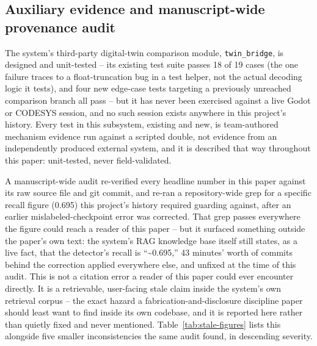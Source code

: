 \subsection{Auxiliary evidence and manuscript-wide provenance audit}
\label{sec:results-audit}

The system's third-party digital-twin comparison module, \texttt{twin\_bridge}, is designed and
unit-tested -- its existing test suite passes 18 of 19 cases (the one failure traces to a
float-truncation bug in a test helper, not the actual decoding logic it tests), and four new
edge-case tests targeting a previously unreached comparison branch all pass -- but it has never
been exercised against a live Godot or CODESYS session, and no such session exists anywhere in this
project's history. Every test in this subsystem, existing and new, is team-authored mechanism
evidence run against a scripted double, not evidence from an independently produced external
system, and it is described that way throughout this paper: unit-tested, never field-validated.

A manuscript-wide audit re-verified every headline number in this paper against its raw source
file and git commit, and re-ran a repository-wide grep for a specific recall figure (0.695) this
project's history required guarding against, after an earlier mislabeled-checkpoint error was
corrected. That grep passes everywhere the figure could reach a reader of this paper -- but it
surfaced something outside the paper's own text: the system's RAG knowledge base itself still
states, as a live fact, that the detector's recall is ``\textasciitilde0.695,'' 43 minutes'
worth of commits behind the correction applied everywhere else, and unfixed at the time of this
audit. This is not a citation error a reader of this paper could ever encounter directly. It is a
retrievable, user-facing stale claim inside the system's own retrieval corpus -- the
exact hazard a fabrication-and-disclosure discipline paper should least want to find inside its
own codebase, and it is reported here rather than quietly fixed and never mentioned.
Table~\ref{tab:stale-figures} lists this alongside five smaller inconsistencies the same audit
found, in descending severity.

